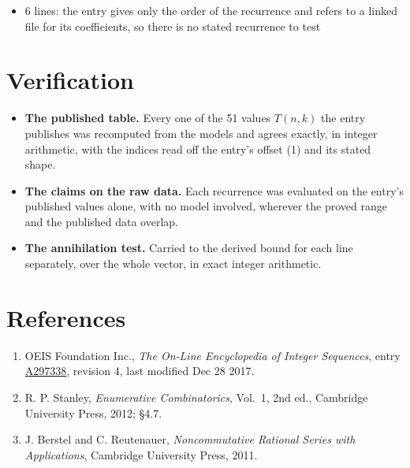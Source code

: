 \documentclass[11pt]{article}
\theoremstyle{definition}
\begin{document}
\begin{itemize}

\item 6 lines: the entry gives only the order of the recurrence and refers to a linked file for its coefficients, so there is no stated recurrence to test

\end{itemize}

\section{Verification}

\begin{itemize}

\item {\bfseries The published table.} Every one of the 51 values $T(n,k)$ the entry publishes was recomputed from the models and agrees exactly, in integer arithmetic, with the indices read off the entry's offset (1) and its stated shape.

\item {\bfseries The claims on the raw data.} Each recurrence was evaluated on the entry's published values alone, with no model involved, wherever the proved range and the published data overlap.

\item {\bfseries The annihilation test.} Carried to the derived bound for each line separately, over the whole vector, in exact integer arithmetic.

\end{itemize}

\section{References}

\begin{enumerate}

\item OEIS Foundation Inc., \emph{The On-Line Encyclopedia of Integer Sequences}, entry \href{https://oeis.org/A297338}{A297338}, revision 4, last modified Dec 28 2017.

\item R. P. Stanley, \emph{Enumerative Combinatorics}, Vol.~1, 2nd ed., Cambridge University Press, 2012; \S4.7.

\item J. Berstel and C. Reutenauer, \emph{Noncommutative Rational Series with Applications}, Cambridge University Press, 2011.

\end{enumerate}
\end{document}
